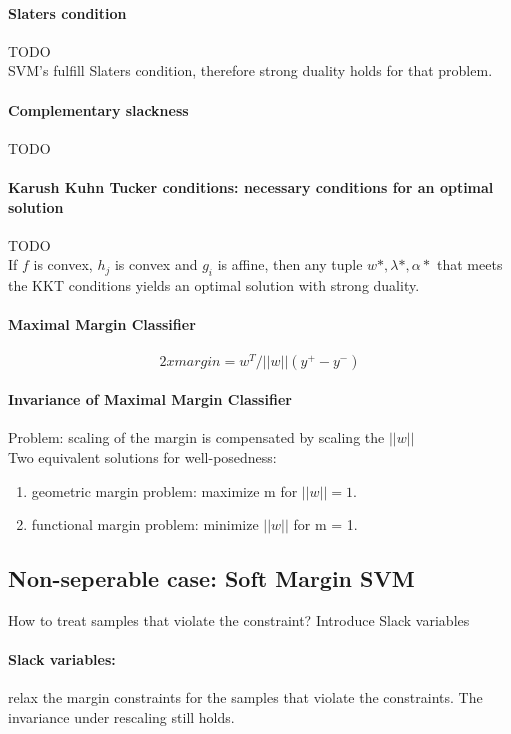 \paragraph{Slaters condition}
TODO\\
SVM's fulfill Slaters condition, therefore strong duality holds for that problem.

\paragraph{Complementary slackness}
TODO

\paragraph{Karush Kuhn Tucker conditions: necessary conditions for an optimal solution}
TODO\\
If $f$ is convex, $h_j$ is convex and $g_i$ is affine, then any tuple $w*,\lambda*,\alpha*$ that meets the KKT conditions yields an optimal solution with strong duality.

\paragraph{Maximal Margin Classifier}
\begin{equation}
    2 x margin = w^T/||w|| (y^+ - y^-)
\end{equation}{}

\paragraph{Invariance of Maximal Margin Classifier}
Problem: scaling of the margin is compensated by scaling the $||w||$\\
Two equivalent solutions for well-posedness:
\begin{enumerate}
    \item geometric margin problem: maximize m for $||w|| = 1$.
    \item functional margin problem: minimize $||w||$ for m = 1.
\end{enumerate}{}

\subsection{Non-seperable case: Soft Margin SVM}
How to treat samples that violate the constraint? Introduce Slack variables

\paragraph{Slack variables:}
relax the margin constraints for the samples that violate the constraints.
The invariance under rescaling still holds.

